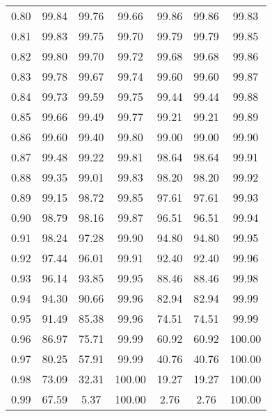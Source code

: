 \begin{tabular}{|c|c|c|c|c|c|c|}
      0.80 &     99.84 &     99.76 &      99.66 &   99.86 &      99.86 &         99.83 \\
      0.81 &     99.83 &     99.75 &      99.70 &   99.79 &      99.79 &         99.85 \\
      0.82 &     99.80 &     99.70 &      99.72 &   99.68 &      99.68 &         99.86 \\
      0.83 &     99.78 &     99.67 &      99.74 &   99.60 &      99.60 &         99.87 \\
      0.84 &     99.73 &     99.59 &      99.75 &   99.44 &      99.44 &         99.88 \\
      0.85 &     99.66 &     99.49 &      99.77 &   99.21 &      99.21 &         99.89 \\
      0.86 &     99.60 &     99.40 &      99.80 &   99.00 &      99.00 &         99.90 \\
      0.87 &     99.48 &     99.22 &      99.81 &   98.64 &      98.64 &         99.91 \\
      0.88 &     99.35 &     99.01 &      99.83 &   98.20 &      98.20 &         99.92 \\
      0.89 &     99.15 &     98.72 &      99.85 &   97.61 &      97.61 &         99.93 \\
      0.90 &     98.79 &     98.16 &      99.87 &   96.51 &      96.51 &         99.94 \\
      0.91 &     98.24 &     97.28 &      99.90 &   94.80 &      94.80 &         99.95 \\
      0.92 &     97.44 &     96.01 &      99.91 &   92.40 &      92.40 &         99.96 \\
      0.93 &     96.14 &     93.85 &      99.95 &   88.46 &      88.46 &         99.98 \\
      0.94 &     94.30 &     90.66 &      99.96 &   82.94 &      82.94 &         99.99 \\
      0.95 &     91.49 &     85.38 &      99.96 &   74.51 &      74.51 &         99.99 \\
      0.96 &     86.97 &     75.71 &      99.99 &   60.92 &      60.92 &        100.00 \\
      0.97 &     80.25 &     57.91 &      99.99 &   40.76 &      40.76 &        100.00 \\
      0.98 &     73.09 &     32.31 &     100.00 &   19.27 &      19.27 &        100.00 \\
      0.99 &     67.59 &      5.37 &     100.00 &    2.76 &       2.76 &        100.00 \\
\bottomrule
\end{tabular}
